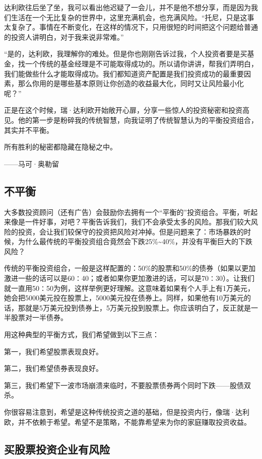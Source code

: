 达利欧往后坐了坐，我可以看出他迟疑了一会儿，并不是他不想分享，而是因为我们生活在一个无比复杂的世界中，这里充满机会，也充满风险。“托尼，只是这事太复杂了。事情在不断变化，在这样的情况下，只用很短的时间把这个问题给普通的投资人讲明白，对于我来说非常难。”

“是的，达利欧，我理解你的难处。但是你也刚刚告诉过我，个人投资者要是买基金，找一个传统的基金经理是不可能取得成功的。所以请你讲讲，帮我们弄明白，我们能做些什么才能取得成功。我们都知道资产配置是我们投资成功的最重要因素，那么你用的是哪些基本原则让你创造的收益最大化，同时又让风险最小化呢？”

正是在这个时候，瑞·达利欧开始敞开心扉，分享一些惊人的投资秘密和投资高见。他的第一步是粉碎我的传统智慧，向我证明了传统智慧认为的平衡投资组合，其实并不平衡。

\begin{BookQuote}
所有胜利的秘密都隐藏在隐秘之中。

\hfill ——马可·奥勒留
\end{BookQuote}

\subsection{不平衡}

大多数投资顾问（还有广告）会鼓励你去拥有一个“平衡的”投资组合。平衡，听起来像是一件好事，对吧？平衡告诉我们，我们不会承受太多的风险。那我们较大风险的投资，会让我们较保守的投资把风险对冲掉。但是问题来了：市场暴跌的时候，为什么最传统的平衡投资组合竟然会下跌25\%\textasciitilde{}40\%，并没有平衡巨大的下跌风险？

传统的平衡投资组合，一般是这样配置的：50\%的股票和50\%的债券（如果以更加激进一些的话可以是60∶40；或者如果你更加激进的话，可以是70∶30）。让我们就一直用50∶50为例，这样举例更好理解。这意味着如果有个人手上有1万美元，她会把5000美元投在股票上，5000美元投在债券上。同样，如果他有10万美元的话，那就是5万美元投到债券上，5万美元投到股票上。你应该明白了，反正就是一半股票对一半债券。

用这种典型的平衡方式，我们希望做到以下三点：

第一，我们希望股票表现良好。

第二，我们希望债券表现良好。

第三，我们希望下一波市场崩溃来临时，不要股票债券两个同时下跌——股债双杀。

你很容易注意到，希望是这种传统投资之道的基础，但是投资内行，像瑞·达利欧，并不依赖于希望。希望不是策略，不能靠希望来为你的家庭赚取投资收益。

\subsection{买股票投资企业有风险}

